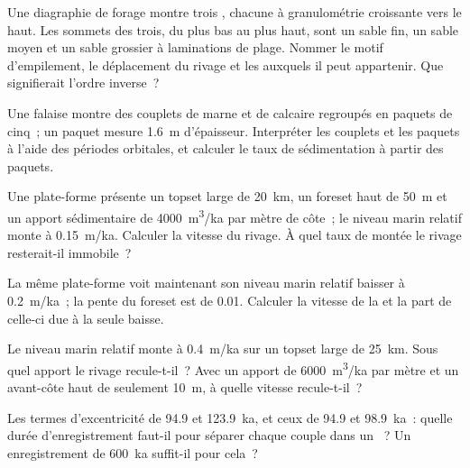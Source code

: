 \begin{exercise}[$\star$]\label{exo:b3:sequence-stratigraphy:3}
Une diagraphie de forage montre trois , chacune à granulométrie croissante vers le haut. Les sommets des
trois, du plus bas au plus haut, sont un sable fin, un sable moyen et un sable grossier à laminations de plage.
Nommer le motif d'empilement, le déplacement du rivage et
les  auxquels il peut appartenir. Que signifierait l'ordre inverse~?
\end{exercise}

\begin{exercise}[$\star$]\label{exo:b3:sequence-stratigraphy:4}
Une falaise montre des couplets de marne et de calcaire regroupés en paquets de cinq~; un
paquet mesure \qty{1.6}{m} d'épaisseur. Interpréter les couplets et les paquets à l'aide des
périodes orbitales, et calculer le taux de sédimentation à partir des paquets.
\end{exercise}

\begin{exercise}[$\star\star$]\label{exo:b3:sequence-stratigraphy:5}
Une plate-forme présente un topset large de \qty{20}{km}, un foreset haut de \qty{50}{m} et un
apport sédimentaire de \qty{4000}{m^3/ka} par mètre de côte~; le niveau marin relatif monte
à \qty{0.15}{m/ka}. Calculer la vitesse du rivage. À quel taux de
montée le rivage resterait-il immobile~?
\end{exercise}

\begin{exercise}[$\star\star$]\label{exo:b3:sequence-stratigraphy:6}
La même plate-forme voit maintenant son niveau marin relatif baisser à \qty{0.2}{m/ka}~; la
pente du foreset est de 0.01. Calculer la vitesse de la  et la
part de celle-ci due à la seule baisse.
\end{exercise}

\begin{exercise}[$\star\star$]\label{exo:b3:sequence-stratigraphy:7}
Le niveau marin relatif monte à \qty{0.4}{m/ka} sur un topset large de \qty{25}{km}.
Sous quel apport le rivage recule-t-il~? Avec un apport de
\qty{6000}{m^3/ka} par mètre et un avant-côte haut de seulement \qty{10}{m}, à quelle
vitesse recule-t-il~?
\end{exercise}

\begin{exercise}[$\star\star$]\label{exo:b3:sequence-stratigraphy:8}
Les termes d'excentricité de 94.9 et \qty{123.9}{ka}, et ceux de 94.9 et
\qty{98.9}{ka}~: quelle durée d'enregistrement faut-il pour séparer chaque couple dans un
~? Un enregistrement de \qty{600}{ka} suffit-il pour cela~?
\end{exercise}

